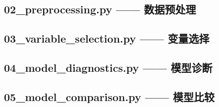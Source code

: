 \documentclass[12pt,a4paper]{ctexart}
\begin{document}
\subsection*{02\_preprocessing.py —— 数据预处理}


\subsection*{03\_variable\_selection.py —— 变量选择}


\subsection*{04\_model\_diagnostics.py —— 模型诊断}


\subsection*{05\_model\_comparison.py —— 模型比较}


\restoregeometry
\end{document}
